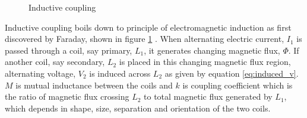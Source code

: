 \documentclass[UKenglish]{ifimaster}  %
\begin{document}
\begin{figure} [!htbp]
  \centering 
\hfill
 \caption{Inductive coupling } 
\label{fig:ant_induction} 
\end{figure}

Inductive coupling boils down to principle of electromagnetic induction as first discovered by Faraday, shown in figure \ref{fig:ant_induction} . When alternating electric current, $I_{1}$ is passed through 
a coil, say primary, $L_{1}$, it generates changing magnetic flux, $\Phi$. If another coil, say secondary, $L_{2}$ is placed in this changing 
magnetic flux region, alternating voltage, $V_{2}$ is induced across $L_{2}$ as given by equation  \ref{eq:induced_v}. $M$ is mutual inductance between the coils and $k$ is coupling coefficient which is the ratio of magnetic flux crossing $L_{2}$ to total magnetic flux generated by $L_{1}$, which depends in shape, size, separation and orientation of the two coils.
\end{document}
